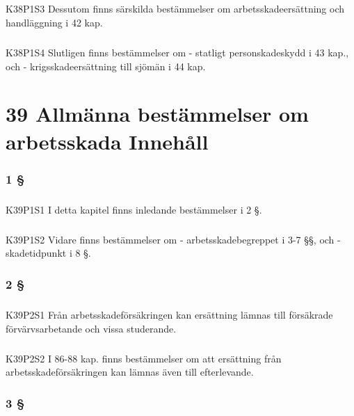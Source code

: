 \documentclass[a4paper,notitlepage,openany,10pt]{book}
\begin{document}
\paragraph*{}
{\tiny K38P1S3}
Dessutom finns särskilda bestämmelser om arbetsskadeersättning och handläggning i 42 kap.
\paragraph*{}
{\tiny K38P1S4}
Slutligen finns bestämmelser om
\newline - statligt personskadeskydd i 43 kap., och
\newline - krigsskadeersättning till sjömän i 44 kap.
\chapter*{39 Allmänna bestämmelser om arbetsskada Innehåll}
\subsection*{1 §}
\paragraph*{}
{\tiny K39P1S1}
I detta kapitel finns inledande bestämmelser i 2 §.
\paragraph*{}
{\tiny K39P1S2}
Vidare finns bestämmelser om
\newline - arbetsskadebegreppet i 3-7 §§, och
\newline - skadetidpunkt i 8 §.
\subsection*{2 §}
\paragraph*{}
{\tiny K39P2S1}
Från arbetsskadeförsäkringen kan ersättning lämnas till försäkrade förvärvsarbetande och vissa studerande.
\paragraph*{}
{\tiny K39P2S2}
I 86-88 kap. finns bestämmelser om att ersättning från arbetsskadeförsäkringen kan lämnas även till efterlevande.
\subsection*{3 §}
\end{document}

